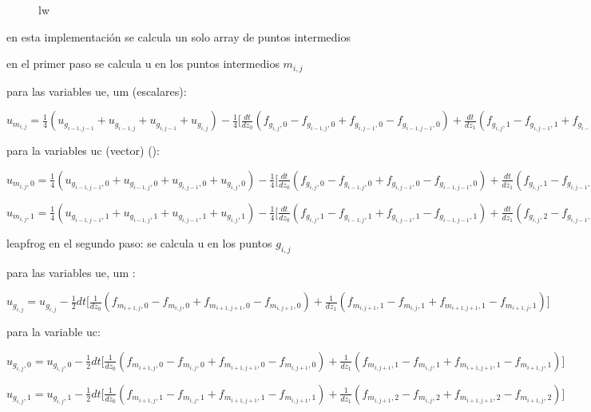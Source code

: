 \documentclass{article}
\begin{document}
\begin{description}
\begin{figure}[ht]


  \caption{lw}
  \label{lw}
\end{figure}

\item en esta implementación se calcula un solo array de puntos intermedios
\item en el primer paso se calcula u en los puntos intermedios $m_{i,j}$

\item para las variables ue, um (escalares):
\item $u_{m_{i,j}} = \frac{1}{4}  (u_{g_{i-1,j-1}} + u_{g_{i-1,j}} + u_{g_{i,j-1}} + u_{g_{i,j}}) - \frac{1}{4}\big[
\frac{dt}{dz_0} (f_{g_{i,j},0} - f_{g_{i-1,j},0} + f_{g_{i,j-1},0} - f_{g_{i-1,j-1},0} ) +
\frac{dt}{dz_1} (f_{g_{i,j},1} - f_{g_{i,j-1},1} + f_{g_{i-1,j},1} - f_{g_{i-1,j-1},1} )  \big] $
\item para la variables uc (vector) ():
\item $u_{m_{i,j},0} = \frac{1}{4}  (u_{g_{i-1,j-1},0} + u_{g_{i-1,j},0} + u_{g_{i,j-1},0} + u_{g_{i,j},0}) - \frac{1}{4}\big[
\frac{dt}{dz_0} (f_{g_{i,j},0} - f_{g_{i-1,j},0} + f_{g_{i,j-1},0} - f_{g_{i-1,j-1},0} ) +
\frac{dt}{dz_1} (f_{g_{i,j},1} - f_{g_{i,j-1},1} + f_{g_{i-1,j},1} - f_{g_{i-1,j-1},1} )  \big] $
\item $u_{m_{i,j},1} = \frac{1}{4}  (u_{g_{i-1,j-1},1} + u_{g_{i-1,j},1} + u_{g_{i,j-1},1} + u_{g_{i,j},1}) - \frac{1}{4}\big[
\frac{dt}{dz_0} (f_{g_{i,j},1} - f_{g_{i-1,j},1} + f_{g_{i,j-1},1} - f_{g_{i-1,j-1},1} ) +
\frac{dt}{dz_1} (f_{g_{i,j},2} - f_{g_{i,j-1},2} + f_{g_{i-1,j},2} - f_{g_{i-1,j-1},2} )  \big] $

\item leapfrog en el segundo paso: se calcula u en los puntos $g_{i,j}$
\item para las variables ue, um :
\item  $u_{g_{i,j}} = u_{g_{i,j}} - \frac{1}{2} dt  \big[ \frac{1}{dz_0} (f_{m_{i+1,j},0} - f_{m_{i,j},0} + 
f_{m_{i+1,j+1},0} - f_{m_{i,j+1},0} )  +  \frac{1}{dz_1}
(f_{m_{i,j+1},1} - f_{m_{i,j},1} + f_{m_{i+1,j+1},1} - f_{m_{i+1,j},1}) \big] $
\item para la variable uc:
\item  $u_{g_{i,j},0} = u_{g_{i,j},0} - \frac{1}{2} dt  \big[ \frac{1}{dz_0} (f_{m_{i+1,j},0} - f_{m_{i,j},0} + 
f_{m_{i+1,j+1},0} - f_{m_{i,j+1},0} )  +  \frac{1}{dz_1}
(f_{m_{i,j+1},1} - f_{m_{i,j},1} + f_{m_{i+1,j+1},1} - f_{m_{i+1,j},1}) \big] $
\item  $u_{g_{i,j},1} = u_{g_{i,j},1} - \frac{1}{2} dt  \big[ \frac{1}{dz_0} (f_{m_{i+1,j},1} - f_{m_{i,j},1} + 
f_{m_{i+1,j+1},1} - f_{m_{i,j+1},1} )  +  \frac{1}{dz_1}
(f_{m_{i,j+1},2} - f_{m_{i,j},2} + f_{m_{i+1,j+1},2} - f_{m_{i+1,j},2}) \big] $



\end{description}
\end{document}
